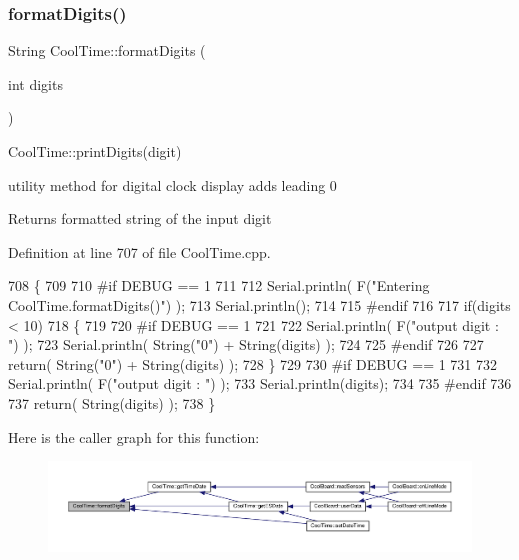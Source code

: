 \subsubsection{\texorpdfstring{format\+Digits()}{formatDigits()}}
{\footnotesize\ttfamily String Cool\+Time\+::format\+Digits (\begin{DoxyParamCaption}\item[{int}]{digits }\end{DoxyParamCaption})}

Cool\+Time\+::print\+Digits(digit)

utility method for digital clock display adds leading 0

\begin{DoxyReturn}{Returns}
formatted string of the input digit 
\end{DoxyReturn}


Definition at line 707 of file Cool\+Time.\+cpp.


\begin{DoxyCode}
708 \{
709 
710 \textcolor{preprocessor}{#if DEBUG == 1 }
711 
712     Serial.println( F(\textcolor{stringliteral}{"Entering CoolTime.formatDigits()"}) );
713     Serial.println();
714 
715 \textcolor{preprocessor}{#endif }
716 
717     \textcolor{keywordflow}{if}(digits < 10)
718     \{
719     
720 \textcolor{preprocessor}{    #if DEBUG == 1}
721 
722         Serial.println( F(\textcolor{stringliteral}{"output digit : "}) );
723         Serial.println( String(\textcolor{stringliteral}{"0"}) + String(digits) );
724 
725 \textcolor{preprocessor}{    #endif}
726 
727         \textcolor{keywordflow}{return}( String(\textcolor{stringliteral}{"0"}) + String(digits) );
728     \}
729     
730 \textcolor{preprocessor}{#if DEBUG == 1 }
731 
732     Serial.println( F(\textcolor{stringliteral}{"output digit : "}) );
733     Serial.println(digits);
734 
735 \textcolor{preprocessor}{#endif}
736 
737     \textcolor{keywordflow}{return}( String(digits) );
738 \}
\end{DoxyCode}
Here is the caller graph for this function\+:\nopagebreak
\begin{figure}[H]
\begin{center}
\leavevmode
\includegraphics[width=350pt]{d6/d49/class_cool_time_acd537cd4210d7bde4e1f5c47d2ac0456_icgraph}
\end{center}
\end{figure}
\mbox{\label{class_cool_time_ac4f32ee513c1328d984306645e8785a4}} 
